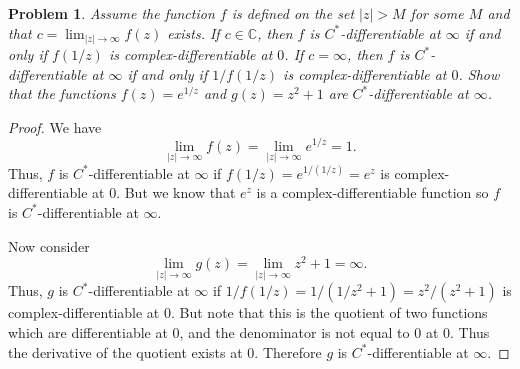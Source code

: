 \documentclass{article}
\newtheorem{problem}{Problem}
\begin{document}
\begin{problem}
Assume the function $f$ is defined on the set $|z| > M$ for some $M$ and that $c = \lim_{|z| \rightarrow \infty} f(z)$ exists. If $c \in \mathbb{C}$, then $f$ is $C^*$-differentiable at $\infty$ if and only if $f(1/z)$ is complex-differentiable at $0$. If $c = \infty$, then $f$ is $C^*$-differentiable at $\infty$ if and only if $1/f(1/z)$ is complex-differentiable at $0$. Show that the functions $f(z) = e^{1/z}$ and $g(z) = z^2 + 1$ are $C^*$-differentiable at $\infty$.
\end{problem}
\begin{proof}
We have
\[
\lim_{|z| \rightarrow \infty} f(z) = \lim_{|z| \rightarrow \infty} e^{1/z} = 1.
\]
Thus, $f$ is $C^*$-differentiable at $\infty$ if $f(1/z) = e^{1/(1/z)} = e^z$ is complex-differentiable at $0$. But we know that $e^z$ is a complex-differentiable function so $f$ is $C^*$-differentiable at $\infty$.

Now consider
\[
\lim_{|z| \rightarrow \infty} g(z) = \lim_{|z| \rightarrow \infty} z^2 + 1 = \infty.
\]
Thus, $g$ is $C^*$-differentiable at $\infty$ if $1/f(1/z) = 1/(1/z^2 + 1) = z^2/(z^2+1)$ is complex-differentiable at $0$. But note that this is the quotient of two functions which are differentiable at $0$, and the denominator is not equal to $0$ at $0$. Thus the derivative of the quotient exists at $0$. Therefore $g$ is $C^*$-differentiable at $\infty$.
\end{proof}
\end{document}
